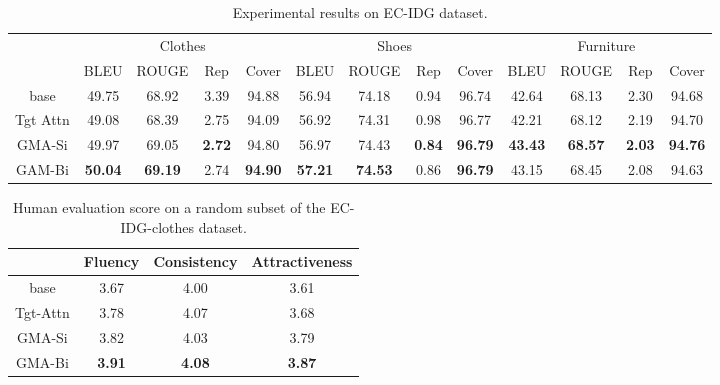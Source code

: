 \documentclass[letterpaper]{article} %
\begin{document}
\begin{table}[]
\centering{}
\renewcommand\arraystretch{1.1}
\small
\vspace{1mm}
\begin{tabular}{c|c|c|c|c|c|c|c|c|c|c|c|c}
\hline
         & \multicolumn{4}{c|}{Clothes}                                     & \multicolumn{4}{c|}{Shoes}                                        
         & \multicolumn{4}{c}{Furniture}                                   \\ \cline{2-13}
         & BLEU            & ROUGE          & Rep            & Cover           & BLEU            & ROUGE           & Rep             & Cover               & BLEU            & ROUGE          & Rep             & Cover           \\ \hline
base     & 49.75           & 68.92           & 3.39           & 94.88           & 56.94           & 74.18           & 0.94            & 96.74            
         & 42.64           & 68.13           & 2.30           & 94.68           \\ \hline
Tgt Attn & 49.08           & 68.39           & 2.75           & 94.09           & 56.92           & 74.31           & 0.98            & 96.77              & 42.21          & 68.12          & 2.19          & 94.70          \\ \hline
GMA-Si   & 49.97           & 69.05          & \textbf{2.72}   & 94.80           & 56.97           & 74.43           & \textbf{0.84} & \textbf{96.79}        & \textbf{43.43}   & \textbf{68.57}  & \textbf{2.03}  & \textbf{94.76} \\ \hline
GAM-Bi   & \textbf{50.04}  & \textbf{69.19} & 2.74            & \textbf{94.90}  & \textbf{57.21}  & \textbf{74.53}  & 0.86           & \textbf{96.79}      & 43.15          & 68.45          & 2.08          & 94.63          \\ \hline
\end{tabular}
\caption{Experimental results on EC-IDG dataset.}
\label{tabel: IDGexp}
\end{table}


\begin{table}[]
\centering
\renewcommand\arraystretch{1.1}
\small
\begin{tabular}{c|c|c|c}
\hline
         & Fluency       & Consistency   & Attractiveness    \\ \hline 
base     & 3.67          & 4.00          & 3.61          \\ \hline
Tgt-Attn & 3.78          & 4.07          & 3.68          \\ \hline
GMA-Si   & 3.82          & 4.03          & 3.79          \\ \hline
GMA-Bi   & \textbf{3.91} & \textbf{4.08} & \textbf{3.87} \\ \hline
\end{tabular}
\caption{Human evaluation score on a random subset of the EC-IDG-clothes dataset.}
\label{table: manually evalue}
\end{table}
\end{document}
